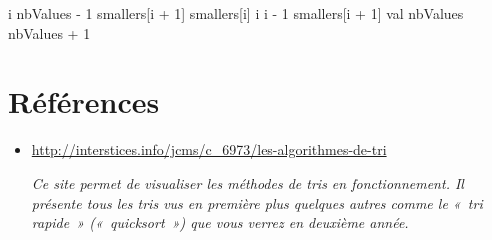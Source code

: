 		\begin{pseudocode}			
				\Let i \Gets nbValues - 1
					\Let smallers[i + 1] \Gets smallers[i]
					\Let i \Gets i - 1
				\EndWhile
				\Let smallers[i + 1] \Gets val
					\Let nbValues \Gets nbValues + 1
				\EndIf
			\EndAlgo
		\end{pseudocode}

\section{Références}

	\begin{itemize}
		\item {
			\url{http://interstices.info/jcms/c_6973/les-algorithmes-de-tri}

			\textit{Ce site permet de visualiser les méthodes de tris en
			fonctionnement. Il présente tous les tris vus en première plus quelques
			autres comme le «~tri rapide~» («~quicksort~») que vous verrez en
			deuxième année.}}
	\end{itemize}
